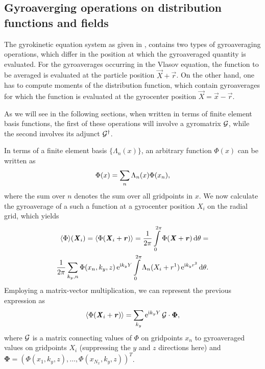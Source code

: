 \documentclass[12pt]{article}
\begin{document}
\subsection{Gyroaverging operations on distribution functions and fields}
The gyrokinetic equation system as given in \cite{Goerler09},
contains two types of gyroaveraging operations, which differ in the
position at which the gyroaveraged quantity is evaluated. 
For the gyroaverages occurring in the Vlasov equation, the 
function to be averaged is evaluated at the particle position 
$\vec X+\vec r$. On the other hand, one has to compute moments of the
distribution function, which contain gyroaverages for which
the function is evaluated at the gyrocenter position $\vec X=\vec x-\vec r$.

As we will see in the following sections, when written in terms of
finite element basis functions, the first of these operations will 
involve a gyromatrix $\mathcal{G}$, while the second involves its adjunct 
$\mathcal{G}^\dag$.

In terms of a finite element basis $\{\Lambda_n(x)\}$, an arbitrary
function $\Phi(x)$ can be written as
\begin{align}
\Phi(x)=\sum\limits_n \Lambda_n(x) \Phi(x_n),
\end{align}
where the sum over $n$ denotes the sum over all gridpoints in $x$.
We now calculate the gyroaverage of a such a function at a gyrocenter
position $X_i$ on the radial grid, which yields
\begin{align}
\nonumber\langle\Phi\rangle(\textbf{\textit{X}}_i)=\langle\Phi(\textbf{\textit{X}}_i+\textbf{\textit{r}})\rangle=
\frac{1}{2\pi}\int\limits_0^{2\pi}\Phi(\textbf{\textit{X}}+\textbf{\textit{r}})\operatorname{d}\!\theta=\\
\frac{1}{2\pi}\sum\limits_{k_y,n}\Phi(x_n,k_y,z)\operatorname{e}^{\operatorname{i}\! k_y Y}\int\limits_0^{2\pi}\Lambda_n(X_i+r^1)
\operatorname{e}^{\operatorname{i}\! k_yr^2}\operatorname{d}\!\theta.
\label{eq:G}
\end{align}
Employing a matrix-vector multiplication, we can represent the previous
expression as
\begin{align}
\langle\Phi(\textbf{\textit{X}}_i+\textbf{\textit{r}})\rangle=\sum\limits_{k_y}\operatorname{e}^{\operatorname{i}\! k_y Y}\mathcal{G}\cdot\mathbf\Phi,
\end{align}
where $\mathcal{G}$ is a matrix connecting values of $\Phi$ on gridpoints $x_n$
to gyroaveraged values on gridpoints $X_i$ (suppressing the $y$ and $z$ 
directions here) and $\mathbf\Phi=(\Phi(x_1,k_y,z),\dots,\Phi(x_{N_x},k_y,z))^T$.
\end{document}
